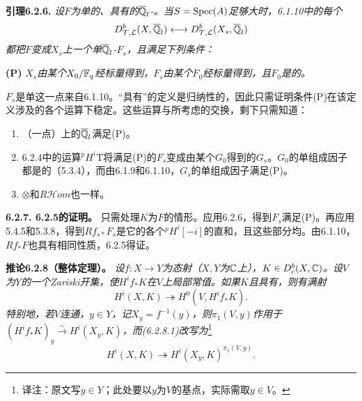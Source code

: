 \par\medskip\noindent\textbf{引理6.2.6.} \emph{设$F$为单的、具有的$\overline{\mathbb Q}_l$-。当$S=\operatorname{Spec}(A)$足够大时，6.1.10中的每个}
\[
D_{\mathcal T,\mathcal L}^b(X,\overline{\mathbb Q}_l)
\longleftrightarrow
D_{\mathcal T,\mathcal L}^b(X_s,\overline{\mathbb Q}_l)
\]
\emph{都把$F$变成$X_s$上一个单$\overline{\mathbb Q}_l$-$F_s$，且满足下列条件：}

\noindent\textbf{(P)} \emph{$X_s$由某个$X_0/\mathbb F_q$经标量得到，$F_s$由某个$F_0$经标量得到，且$F_0$是的。}

$F_s$是单这一点来自6.1.10。“具有”的定义是归纳性的，因此只需证明条件(P)在该定义涉及的各个运算下稳定。这些运算与所考虑的交换，剩下只需知道：
\begin{enumerate}[label=(\alph*)]
\item （一点）上的$\overline{\mathbb Q}_l$满足(P)。
\item 6.2.4中的运算${}^pH^i\mathrm T$将满足(P)的$F_s$变成由某个$G_0$得到的$G_s$。$G_0$的单组成因子都是的（5.3.4），而由6.1.9和6.1.10，$G_s$的单组成因子满足(P)。
\item $\otimes$和$R\mathcal Hom$也一样。
\end{enumerate}

\par\medskip\noindent\textbf{6.2.7. 6.2.5的证明。} 只需处理$K$为$F$的情形。应用6.2.6，得到$F_s$满足(P)。再应用5.4.5和5.3.8，得到$Rf_{s*}F_s$是它的各个${}^pH^i[-i]$的直和，且这些部分均。由6.1.10，$Rf_*F$也具有相同性质，6.2.5得证。

\par\medskip\noindent\textbf{推论6.2.8（整体定理）。} \emph{设$f:X\to Y$为态射（$X,Y$为$\mathbb C$上），$K\in D_c^b(X,\mathbb C)$。设$V$为$Y$的一个Zariski开集，使$H^if_*K$在$V$上局部常值。如果$K$且具有，则有满射}
\begin{equation*}
H^i(X,K)\twoheadrightarrow H^0(V,H^if_*K).
\tag{6.2.8.1}
\end{equation*}
\emph{特别地，若$V$连通，$y\in Y$，记$X_y=f^{-1}(y)$，则$\pi_1(V,y)$作用于$(H^if_*K)_y\xrightarrow{\sim}H^i(X_y,K)$，而(6.2.8.1)改写为}\footnote{译注：原文写$y\in Y$；此处要以$y$为$V$的基点，实际需取$y\in V$。}
\begin{equation*}
H^i(X,K)\twoheadrightarrow H^i(X_y,K)^{\pi_1(V,y)}.
\tag{6.2.8.2}
\end{equation*}

